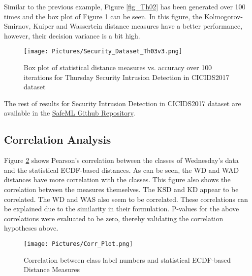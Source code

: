 \documentclass{article}
\begin{document}
Similar to the previous example, Figure \ref{fig_Th02} has been generated over 100 times and the box plot of Figure \ref{fig_Th03} can be seen. In this figure, the Kolmogorov-Smirnov, Kuiper and Wassertein distance measures have a better performance, however, their decision variance is a bit high.

\begin{figure}
\texttt{[image: Pictures/Security\_Dataset\_Th03v3.png]}
\caption{Box plot of statistical distance measures vs. accuracy over 100 iterations for Thursday Security Intrusion Detection in CICIDS2017 dataset} \label{fig_Th03}
\end{figure}

The rest of results for Security Intrusion Detection in CICIDS2017 dataset are available in the \href{https://github.com/ISorokos/SafeML}{SafeML Github Repository}. 



\subsection{Correlation Analysis} \label{subsection-SHT}
Figure \ref{fig_corr} shows Pearson's correlation between the classes of Wednesday's data and the statistical ECDF-based distances. As can be seen, the WD and WAD distances have more correlation with the classes. This figure also shows the correlation between the measures themselves. The KSD and KD appear to be correlated. The WD and WAS also seem to be correlated. These correlations can be explained due to the similarity in their formulation. P-values for the above correlations were evaluated to be zero, thereby validating the correlation hypotheses above.
\begin{figure}
\centering
\texttt{[image: Pictures/Corr\_Plot.png]}
\caption{Correlation between class label numbers and statistical ECDF-based Distance Measures} \label{fig_corr}
\end{figure}
\end{document}
